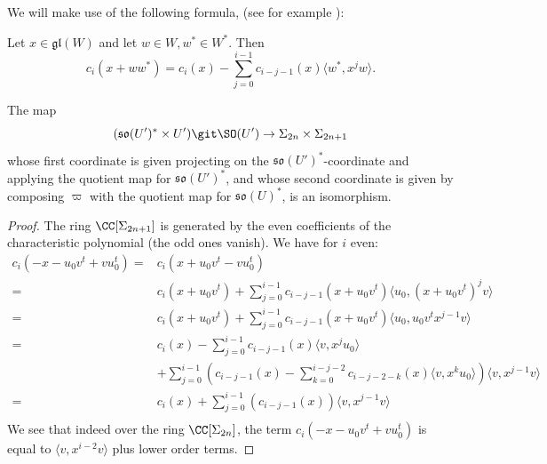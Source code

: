 \documentclass[11pt]{article}
\begin{document}
We will make use of the following formula, (see for example \cite[Theorem A.2]{M}):
\begin{proposition}\label{prop: char poly formula}
    Let $x\in \mathfrak{gl}(W)$ and let $w\in W, w^*\in W^*$. Then
    $$c_i(x+ww^*) = c_i(x) - \sum_{j=0}^{i-1} c_{i-j-1}(x) \langle w^*, x^jw \rangle.$$
\end{proposition}
\begin{claim}\label{claim: categorical quotient}
    The map $$(\mathfrak{so}(U')^*\times U')\git \SO(U') \to \Sigma_{2n}\times \Sigma_{2n+1}$$
    whose first coordinate is given projecting on the $\mathfrak{so}(U')^*$-coordinate and applying the quotient map for $\mathfrak{so}(U')^*$, and whose second coordinate is given by composing $\varpi$ with the quotient map for $\mathfrak{so}(U)^*$, is an isomorphism.
\end{claim}
\begin{proof}
    The ring $\CC[\Sigma_{2n+1}]$ is generated by the even coefficients of the characteristic polynomial (the odd ones vanish). We have for $i$ even:
    \begin{equation}\label{eq: invariants}
        \begin{aligned}
            c_i(-x-u_0v^t+vu_0^t) =&c_i(x+u_0v^t-vu_0^t) \\=& c_i(x+u_0v^t) + \sum_{j=0}^{i-1} c_{i-j-1}(x+u_0v^t) \langle u_0, (x+u_0v^t)^j v \rangle\\
            =&c_i(x+u_0v^t) + \sum_{j=0}^{i-1} c_{i-j-1}(x+u_0v^t) \langle u_0, u_0v^tx^{j-1} v \rangle\\
            =& c_i(x) - \sum_{j=0}^{i-1} c_{i-j-1}(x) \langle v, x^j u_0 \rangle \\&+ \sum_{j=0}^{i-1} \left(c_{i-j-1}(x) - \sum_{k=0}^{i-j-2} c_{i-j-2-k}(x)\langle v, x^k u_0 \rangle\right) \langle v, x^{j-1} v \rangle\\
            =& c_i(x) + \sum_{j=0}^{i-1} \left(c_{i-j-1}(x)\right) \langle v, x^{j-1} v \rangle\\
        \end{aligned}
    \end{equation}
    We see that indeed over the ring $\CC[\Sigma_{2n}]$, the term $c_i(-x-u_0v^t+vu_0^t)$ is equal to $\langle v, x^{i-2} v \rangle$ plus lower order terms.
\end{proof}
\end{document}
